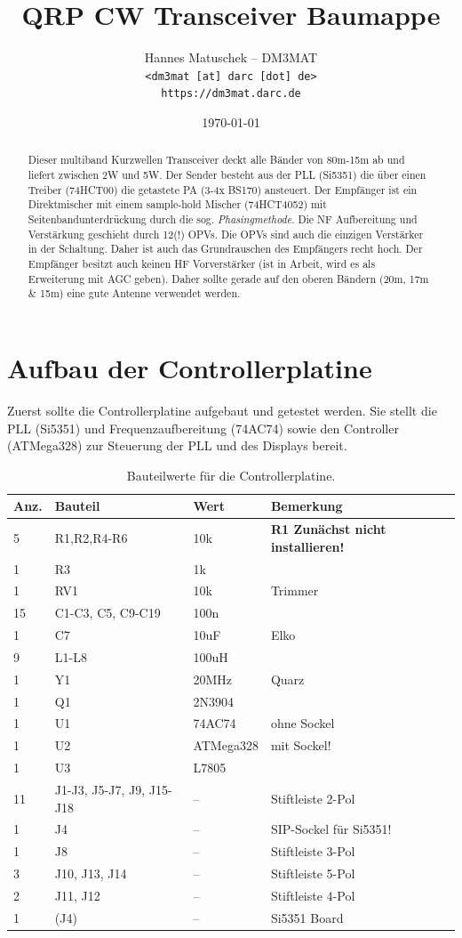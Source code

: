 \documentclass[10pt, a4paper]{paper}
\title{QRP CW Transceiver Baumappe}
\author{Hannes Matuschek -- DM3MAT\\\texttt{<dm3mat [at] darc [dot] de>}\\\texttt{https://dm3mat.darc.de}}
\date{\today}
\newcommand{\warn}[1]{\textbf{#1}}
\begin{document}
\maketitle

\begin{abstract}
Dieser multiband Kurzwellen Transceiver deckt alle Bänder von 80m-15m ab und liefert zwischen 2W und 5W. Der Sender besteht aus der PLL (Si5351) die über einen Treiber (74HCT00) die getastete PA (3-4x BS170) ansteuert. Der Empfänger ist ein Direktmischer mit einem sample-hold Mischer (74HCT4052) mit Seitenbandunterdrückung durch die sog. \emph{Phasingmethode}. Die NF Aufbereitung und Verstärkung geschieht durch 12(!) OPVs. Die OPVs sind auch die einzigen Verstärker in der Schaltung. Daher ist auch das Grundrauschen des Empfängers recht hoch. Der Empfänger besitzt auch keinen HF Vorverstärker (ist in Arbeit, wird es als Erweiterung mit AGC geben). Daher sollte gerade auf den oberen Bändern (20m, 17m \& 15m) eine gute Antenne verwendet werden. 
\end{abstract}


\section{Aufbau der Controllerplatine} \label{sec:ctrl}
Zuerst sollte die Controllerplatine aufgebaut und getestet werden. Sie stellt die PLL (Si5351) und Frequenzaufbereitung (74AC74) sowie den Controller (ATMega328) zur Steuerung der PLL und des Displays bereit. 

\begin{table}[!ht]
\centering
\begin{tabular}{|l|l|l|l|}
\hline 
Anz. & Bauteil & Wert & Bemerkung \\ \hline 
5    & R1,R2,R4-R6 & 10k & \warn{R1 Zunächst nicht installieren!} \\
1    & R3 & 1k & \\
1    & RV1 & 10k & Trimmer\\
15   & C1-C3, C5, C9-C19 & 100n & \\
1    & C7 & 10uF & Elko \\
9    & L1-L8 & 100uH & \\
1    & Y1 & 20MHz & Quarz \\
1    & Q1 & 2N3904 & \\
1    & U1 & 74AC74 & ohne Sockel \\
1    & U2 & ATMega328 & mit Sockel! \\
1    & U3 & L7805 & \\
11   & J1-J3, J5-J7, J9, J15-J18 & -- & Stiftleiste 2-Pol \\
1    & J4 & -- & SIP-Sockel für Si5351! \\
1    & J8 & -- & Stiftleiste 3-Pol \\
3    & J10, J13, J14 & -- & Stiftleiste 5-Pol \\
2    & J11, J12 & -- & Stiftleiste 4-Pol \\
1    & (J4) & -- & Si5351 Board \\\hline
\end{tabular}
\caption{Bauteilwerte für die Controllerplatine.}
\end{table}
\end{document}
